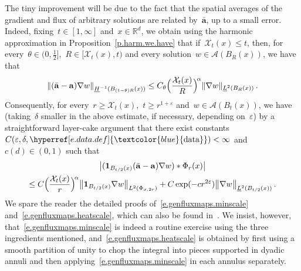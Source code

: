 \documentclass[11pt,twoside]{article} %
\numberwithin{equation}{section}
\theoremstyle{definition}
\newcommand{\dataref}{\hyperref[e.data.def]{\textcolor{blue}{\ensuremath{\mathrm{data}}}}}
\let\originalleft\left
\let\originalright\right
\renewcommand{\left}{\mathopen{}\mathclose\bgroup\originalleft}
\renewcommand{\right}{\aftergroup\egroup\originalright}
\newcommand{\norm}[1]{\left\|#1\right\|}
\newcommand*{\R}{\ensuremath{\mathbb{R}}}
\newcommand{\eps}{\varepsilon}
\newcommand{\ep}{\eps}
\renewcommand{\a}{\mathbf{a}}
\newcommand{\ahom}{\bar{\a}}
\newcommand{\X}{\mathcal{X}}
\newcommand{\indc}{\boldsymbol{1}}
\newcommand{\A}{\mathcal{A}}
\begin{document}
\smallskip

The tiny improvement will be due to the fact that the spatial averages of the gradient and flux of arbitrary solutions are related by~$\ahom$, up to a small error. Indeed, fixing~$t \in [1,\infty]$ and~$x \in \R^d$,  we obtain using the harmonic approximation in Proposition~\ref{p.harm.we.have} that if~$\X_t(x) \leq t$, then, for every~$\theta \in (0,\frac12]$,~$R \in [\X_t(x),t)$ and every solution~$w\in \A(B_R(x))$,  we have that
\begin{align}
\label{e.genfluxmaps.minscale}
\norm{ (\ahom - \a ) \nabla w }_{\underline{H}^{-1}(B_{(1-\theta)R}(x))}
\leq
C_\theta \Bigl( \frac{\X_t(x)}{R} \Bigr)^{\! \alpha} 
\| \nabla w \|_{\underline{L}^{2} \left( B_{R}(x) \right)}
\,.
\end{align}
Consequently, for every~$r\geq \X_t(x)$,~$t \geq r^{1+\ep}$ and~$w \in \A(B_t(x))$, we have (taking~$\delta$ smaller in the above estimate, if necessary, depending on~$\ep$) by a straightforward layer-cake argument that there exist constants~$C(\ep,\delta,\dataref) < \infty$ and~$c(d) \in (0,1)$ such that
\begin{multline}
\label{e.genfluxmaps.heatscale}
\bigl| 
(  \indc_{B_{t/2}(x)} (\ahom  - \a ) \nabla w ) \ast \Phi_{r}(x)   \bigr|
\\ 
\leq
C \Bigl( \frac{\X_t(x)}{r} \Bigr)^{\! \alpha}  \big\|   \indc_{B_{t/2}(x)}  \nabla w  \big\|_{L^2(\Phi_{x,2r})} 
+ C \exp(-c r^{2\ep}) \big\| \nabla w \big\|_{\underline{L}^2(B_{t/2}(x))} 
\,.
\end{multline}
We spare the reader the detailed proofs of~\eqref{e.genfluxmaps.minscale} and~\eqref{e.genfluxmaps.heatscale}, which can also be found in~\cite{AKMBook}. We insist, however, that~\eqref{e.genfluxmaps.minscale} is indeed a routine exercise using the three ingredients mentioned, and~\eqref{e.genfluxmaps.heatscale} is obtained by first using a smooth partition of unity to chop the integral into pieces supported in dyadic annuli and then applying~\eqref{e.genfluxmaps.minscale} in each annulus separately.

\smallskip
\end{document}

